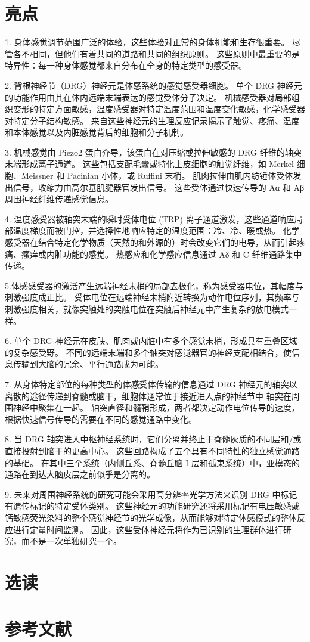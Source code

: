 \section{亮点}


1. 身体感觉调节范围广泛的体验，这些体验对正常的身体机能和生存很重要。 
尽管各不相同，但他们有着共同的道路和共同的组织原则。 
这些原则中最重要的是特异性：每一种身体感觉都来自分布在全身的特定类型的感受器。 


2. 背根神经节（DRG）神经元是体感系统的感觉感受器细胞。 
单个 DRG 神经元的功能作用由其在体内远端末端表达的感觉受体分子决定。 
机械感受器对局部组织变形的特定方面敏感，温度感受器对特定温度范围和温度变化敏感，化学感受器对特定分子结构敏感。 
来自这些神经元的生理反应记录揭示了触觉、疼痛、温度和本体感觉以及内脏感觉背后的细胞和分子机制。 


3. 机械感觉由 Piezo2 蛋白介导，该蛋白在对压缩或拉伸敏感的 DRG 纤维的轴突末端形成离子通道。 
这些包括支配毛囊或特化上皮细胞的触觉纤维，如 Merkel 细胞、Meissner 和 Pacinian 小体，或 Ruffini 末梢。 
肌肉拉伸由肌内纺锤体受体发出信号，收缩力由高尔基肌腱器官发出信号。 
这些受体通过快速传导的 Aα 和 Aβ 周围神经纤维传递感觉信息。 


4. 温度感受器被轴突末端的瞬时受体电位 (TRP) 离子通道激发，这些通道响应局部温度梯度而被门控，并选择性地响应特定的温度范围：冷、冷、暖或热。 
化学感受器在结合特定化学物质（天然的和外源的）时会改变它们的电导，从而引起疼痛、瘙痒或内脏功能的感觉。 热感应和化学感应信息通过 Aδ 和 C 纤维通路集中传递。 


5.体感感受器的激活产生远端神经末梢的局部去极化，称为感受器电位，其幅度与刺激强度成正比。 
受体电位在远端神经末梢附近转换为动作电位序列，其频率与刺激强度相关，就像突触处的突触电位在突触后神经元中产生复杂的放电模式一样。 


6. 单个 DRG 神经元在皮肤、肌肉或内脏中有多个感觉末梢，形成具有重叠区域的复杂感受野。 
不同的远端末端和多个轴突对感觉器官的神经支配相结合，使信息传输到大脑的冗余、平行通路成为可能。 


7. 从身体特定部位的每种类型的体感受体传输的信息通过 DRG 神经元的轴突以离散的途径传递到脊髓或脑干，细胞体通常位于接近进入点的神经节中 轴突在周围神经中聚集在一起。 
轴突直径和髓鞘形成，两者都决定动作电位传导的速度，根据快速信号传导的需要在不同的感觉通路中变化。 


8. 当 DRG 轴突进入中枢神经系统时，它们分离并终止于脊髓灰质的不同层和/或直接投射到脑干的更高中心。 
这些回路构成了五个具有不同特性的独立感觉通路的基础。 
在其中三个系统（内侧丘系、脊髓丘脑 I 层和孤束系统）中，亚模态的通路在到达大脑皮层之前似乎是分离的。 


9. 未来对周围神经系统的研究可能会采用高分辨率光学方法来识别 DRG 中标记有遗传标记的特定受体类别。 
这些神经元的功能研究还将采用标记有电压敏感或钙敏感荧光染料的整个感觉神经节的光学成像，从而能够对特定体感模式的整体反应进行定量时间监测。 
因此，这些受体神经元将作为已识别的生理群体进行研究，而不是一次单独研究一个。


\section{选读}

\section{参考文献}
